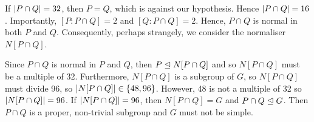 \documentclass{article}
\begin{document}
\begin{flushleft}
    If $|P \cap Q| = 32$, then $P = Q$, which is against our hypothesis. Hence $|P \cap Q| = 16$. Importantly, $[P : P \cap Q] = 2$ and $[Q : P \cap Q] = 2$. Hence, $P \cap Q$ is normal in both $P$ and $Q$. Consequently, perhaps strangely, we consider the normaliser $N[P \cap Q]$. \newline

    Since $P \cap Q$ is normal in $P$ and $Q$, then $P \trianglelefteq N[P \cap Q]$ and so $N[P \cap Q]$ must be a multiple of 32. Furthermore, $N[P \cap Q]$ is a subgroup of $G$, so $N[P \cap Q]$ must divide 96, so $|N[P \cap Q]| \in \{48, 96\}$. However, 48 is not a multiple of 32 so $|N[P \cap Q]| = 96$. If $|N[P \cap Q]| = 96$, then $N[P \cap Q] = G$ and $P \cap Q \trianglelefteq G$. Then $P \cap Q$ is a proper, non-trivial subgroup and $G$ must not be simple. \newline 
    
\end{flushleft}
\end{document}
